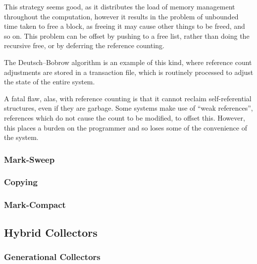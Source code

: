 This strategy seems good, as it distributes the load of memory
management throughout the computation, however it results in the
problem of unbounded time taken to free a block, as freeing it may
cause other things to be freed, and so on\cite{GarbageCollection}.
This problem can be offset by pushing to a free list, rather than
doing the recursive free, or by deferring the reference counting.

The Deutsch--Bobrow algorithm is an example of this kind, where
reference count adjustments are stored in a transaction file, which is
routinely processed to adjust the state of the entire
system\cite{Deutsch76}.

A fatal flaw, alas, with reference counting is that it cannot reclaim
self-referential structures, even if they are
garbage\cite{McBeth63}. Some systems make use of ``weak references'',
references which do not cause the count to be modified, to offset
this. However, this places a burden on the programmer and so loses
some of the convenience of the system.

\subsubsection{Mark-Sweep}


\subsubsection{Copying}


\subsubsection{Mark-Compact}


\subsection{Hybrid Collectors}


\subsubsection{Generational Collectors}

